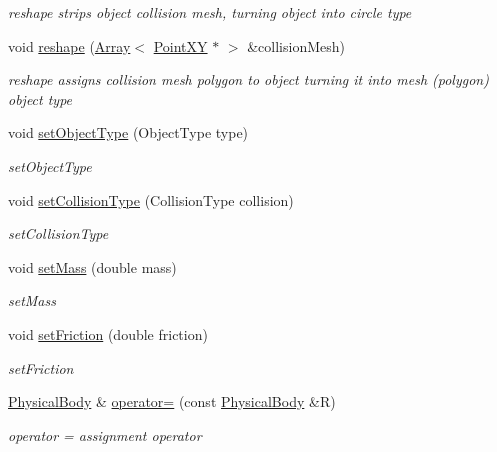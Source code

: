 \begin{DoxyCompactItemize}
\begin{DoxyCompactList}\small\item\em reshape strips object collision mesh, turning object into circle type \end{DoxyCompactList}\item 
void \hyperlink{classPhysicalBody_ae7e0ccd04b9e9e83a9777f016b094914}{reshape} (\hyperlink{classArray}{Array}$<$ \hyperlink{classPointXY}{Point\+X\+Y} $\ast$ $>$ \&collision\+Mesh)
\begin{DoxyCompactList}\small\item\em reshape assigns collision mesh polygon to object turning it into mesh (polygon) object type \end{DoxyCompactList}\item 
void \hyperlink{classPhysicalBody_a089a6ea0bbc6e38e9ea09170f123ad64}{set\+Object\+Type} (Object\+Type type)
\begin{DoxyCompactList}\small\item\em set\+Object\+Type \end{DoxyCompactList}\item 
void \hyperlink{classPhysicalBody_ab5aebc5188db718079e4f3e5fc51d8b7}{set\+Collision\+Type} (Collision\+Type collision)
\begin{DoxyCompactList}\small\item\em set\+Collision\+Type \end{DoxyCompactList}\item 
void \hyperlink{classPhysicalBody_a02bfe02d6439f40f41b47ee797533cb6}{set\+Mass} (double mass)
\begin{DoxyCompactList}\small\item\em set\+Mass \end{DoxyCompactList}\item 
void \hyperlink{classPhysicalBody_a44e55add5d12fc288b656f47f983b42a}{set\+Friction} (double friction)
\begin{DoxyCompactList}\small\item\em set\+Friction \end{DoxyCompactList}\item 
\hyperlink{classPhysicalBody}{Physical\+Body} \& \hyperlink{classPhysicalBody_adeff65b6b3f377362e5d3140b8dd9258}{operator=} (const \hyperlink{classPhysicalBody}{Physical\+Body} \&R)
\begin{DoxyCompactList}\small\item\em operator = assignment operator \end{DoxyCompactList}\end{DoxyCompactItemize}
